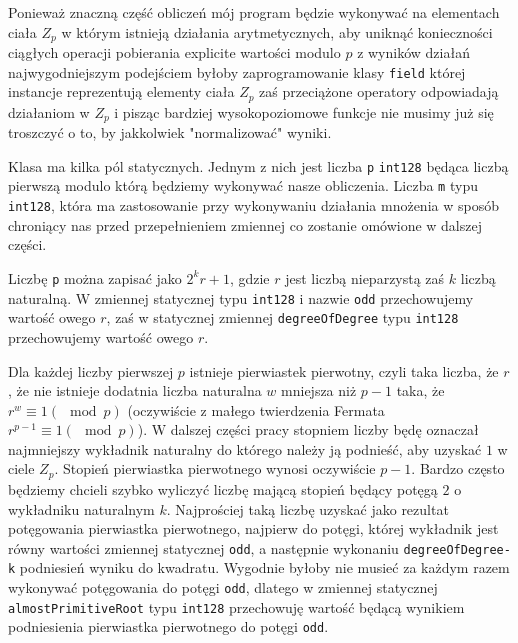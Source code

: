 \documentclass{article}
\begin{document}
Ponieważ znaczną część obliczeń mój program będzie wykonywać na elementach ciała
$Z_p$ w którym istnieją działania arytmetycznych, aby uniknąć konieczności ciągłych operacji pobierania explicite
wartości modulo $p$ z wyników działań najwygodniejszym podejściem byłoby zaprogramowanie klasy \texttt{field} której instancje
reprezentują elementy ciała $Z_p$ zaś przeciążone operatory odpowiadają działaniom w $Z_p$ i pisząc bardziej 
wysokopoziomowe funkcje nie musimy już się troszczyć o to, by jakkolwiek "normalizować" wyniki. 


Klasa ma kilka pól statycznych. Jednym z nich jest liczba \texttt{p} \texttt{\textunderscore \textunderscore int128}
będąca liczbą pierwszą modulo którą będziemy wykonywać nasze obliczenia. Liczba \texttt{m} typu 
\texttt{\textunderscore \textunderscore int128}, która ma zastosowanie przy wykonywaniu działania mnożenia w sposób
chroniący nas przed przepełnieniem zmiennej co zostanie omówione w dalszej części. 

Liczbę \texttt{p} można zapisać jako $2^kr+1$, gdzie $r$ jest liczbą nieparzystą zaś $k$ liczbą naturalną.
W zmiennej statycznej typu \texttt{\textunderscore \textunderscore int128} i nazwie \texttt{odd} przechowujemy
wartość owego $r$, zaś w statycznej zmiennej \texttt{degreeOfDegree} typu
\texttt{\textunderscore \textunderscore int128} przechowujemy wartość owego $r$.

Dla każdej liczby pierwszej $p$ istnieje pierwiastek pierwotny, czyli taka liczba, że $r$, że nie istnieje 
dodatnia liczba naturalna $w$ mniejsza niż $p-1$ taka, że $r^w \equiv 1 (\mod p)$ (oczywiście z małego twierdzenia
Fermata $r^{p-1} \equiv 1 (\mod p)$). W dalszej części pracy stopniem liczby będę oznaczał najmniejszy wykładnik
naturalny do którego należy ją podnieść, aby uzyskać $1$ w ciele $Z_p$. Stopień pierwiastka pierwotnego wynosi 
oczywiście $p-1$. Bardzo często będziemy chcieli szybko wyliczyć liczbę mającą stopień będący potęgą $2$ o 
wykładniku naturalnym $k$. Najprościej taką liczbę uzyskać jako rezultat potęgowania pierwiastka pierwotnego,
najpierw do potęgi, której wykładnik jest równy wartości zmiennej statycznej \texttt{odd}, a następnie
wykonaniu \texttt{degreeOfDegree-k}  podniesień wyniku do kwadratu. Wygodnie byłoby nie musieć za każdym razem
wykonywać potęgowania do potęgi \texttt{odd}, dlatego w zmiennej statycznej \texttt{almostPrimitiveRoot}
typu \texttt{\textunderscore \textunderscore int128} przechowuję wartość będącą wynikiem podniesienia pierwiastka
pierwotnego do potęgi \texttt{odd}.
\end{document}

